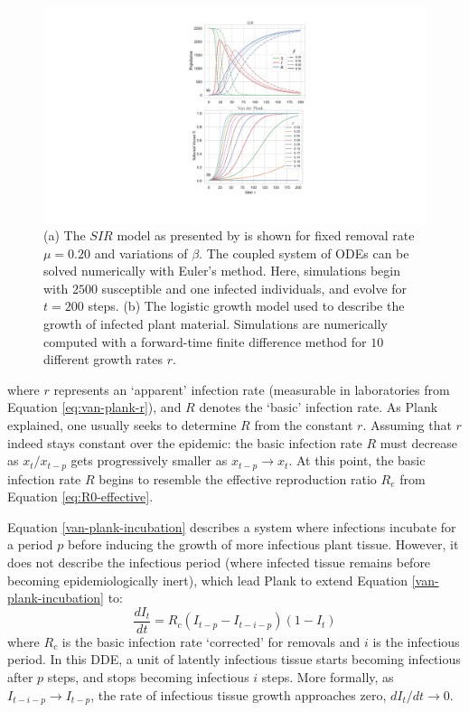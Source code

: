 \begin{figure}
     \centering
     \includegraphics[scale=0.55]{chapter2/figures/SIR-vs-Plank.pdf}
     \caption{(a) The $SIR$ model as presented by \cite{kermack-model} is shown for fixed removal rate $\mu = 0.20$ and variations of $\beta$. 
                  The coupled system of ODEs can be solved numerically with Euler's method. Here, simulations begin with 
                  $2500$ susceptible and one infected individuals, and evolve for $t=200$ steps.
                  (b) The logistic growth model \cite{van2013plant} used to describe the growth of infected plant material.
                  Simulations are numerically computed with a forward-time finite difference method for $10$ different growth rates $r$.
       } 
     \label{fig:SIR-vs-plank}
 \end{figure}
where $r$ represents an `apparent' infection rate (measurable in laboratories from Equation \ref{eq:van-plank-r}),
and $R$ denotes the `basic' infection rate. As Plank explained, one usually seeks
to determine $R$ from the constant $r$. Assuming that $r$ indeed stays constant over the epidemic:
the basic infection rate $R$ must decrease as $x_t/x_{t-p}$ gets progressively smaller as $x_{t-p}\rightarrow x_t $.
At this point, the basic infection rate $R$ begins to resemble the effective reproduction ratio $R_e$
from Equation \ref{eq:R0-effective}. 

Equation \ref{van-plank-incubation} describes a system where
infections incubate for a period $p$ before inducing the growth of more infectious plant tissue.
However, it does not describe the infectious period (where infected tissue remains before becoming epidemiologically inert),
which lead Plank to extend Equation \ref{van-plank-incubation} to:
\begin{equation}
\label{van-plank-infectious-p}
    \frac{dI_t}{dt} = R_c(I_{t-p} - I_{t-i-p})(1 - I_{t})
\end{equation}
where $R_c$ is the basic infection rate `corrected' for removals and $i$ is the infectious period.
In this DDE, a unit of latently infectious tissue starts becoming infectious after $p$ steps, and stops becoming infectious $i$ steps.
More formally, as $I_{t-i-p} \rightarrow I_{t-p}$, the rate of infectious tissue growth approaches zero, $dI_t/dt \rightarrow 0$.

